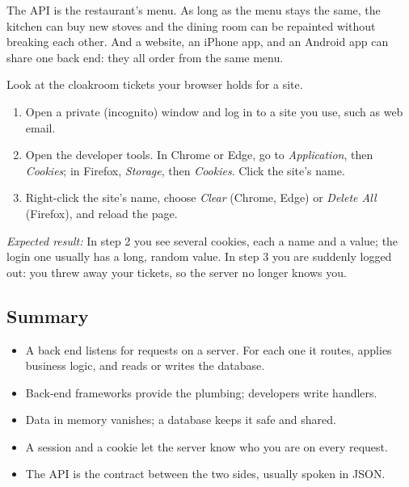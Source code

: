 The API is the restaurant's menu. As long as the menu stays the same, the kitchen can buy new stoves and the dining room can be repainted without breaking each other. And a website, an iPhone app, and an Android app can share one back end: they all order from the same menu.

\label{webapp-03:try-it}

Look at the cloakroom tickets your browser holds for a site.

\begin{enumerate}
\def\labelenumi{\arabic{enumi}.}
\tightlist
\item
  Open a private (incognito) window and log in to a site you use, such as web email.
\item
  Open the developer tools. In Chrome or Edge, go to \emph{Application}, then \emph{Cookies}; in Firefox, \emph{Storage}, then \emph{Cookies}. Click the site's name.
\item
  Right-click the site's name, choose \emph{Clear} (Chrome, Edge) or \emph{Delete All} (Firefox), and reload the page.
\end{enumerate}

\noindent{}\emph{Expected result:} In step 2 you see several cookies, each a name and a value; the login one usually has a long, random value. In step 3 you are suddenly logged out: you threw away your tickets, so the server no longer knows you.

\label{webapp-03:summary-key-terms-and-review-questions}

\subsection*{Summary}\label{webapp-03:summary}

\begin{itemize}
\tightlist
\item
  A back end listens for requests on a server. For each one it routes, applies business logic, and reads or writes the database.
\item
  Back-end frameworks provide the plumbing; developers write handlers.
\item
  Data in memory vanishes; a database keeps it safe and shared.
\item
  A session and a cookie let the server know who you are on every request.
\item
  The API is the contract between the two sides, usually spoken in JSON.
\end{itemize}

